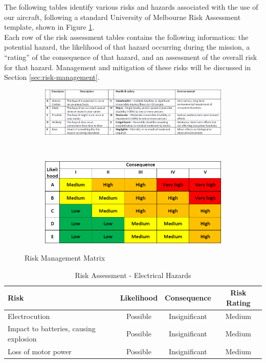 \label{sec:risk-assessment}
The following tables identify various risks and hazards associated with the use of our aircraft, following a standard University of Melbourne Risk Assessment template, shown in Figure \ref{fig:risk-matrix}.\\

Each row of the risk assessment tables contains the following information: the potential hazard, the likelihood of that hazard occurring during the mission, a ``rating'' of the consequence of that hazard, and an assessment of the overall risk for that hazard. Management and mitigation of these risks will be discussed in Section \ref{sec:risk-management}.

\begin{figure}[H]
	
	\begin{subfigure}{\linewidth}
		\centerline{\includegraphics[width=550pt]{../Images/risk-matrix}}
	\end{subfigure}\\[2ex]
	
	\begin{subfigure}{\linewidth}
		\centerline{\includegraphics[width=300pt]{../Images/risk-matrix-2}}
	\end{subfigure}
	
	\caption{Risk Management Matrix}
	\label{fig:risk-matrix}
\end{figure}

\begin{table}[!h]
	\label{tab:risks-electrical}
	\centering
	\begin{tabularx}{\textwidth}{|Y|c|c|c|}
		\hline
		\textbf{Risk} & \textbf{Likelihood} & \textbf{Consequence} & \textbf{Risk Rating}\\
		\hline
		Electrocution & Possible & Insignificant & Medium\\
		\hline
		Impact to batteries, causing explosion & Possible & Insignificant & Medium\\
		\hline
		Loss of motor power & Possible & Insignificant & Medium\\		
		\hline
	\end{tabularx} 
	\caption{Risk Assessment - Electrical Hazards}
\end{table}

